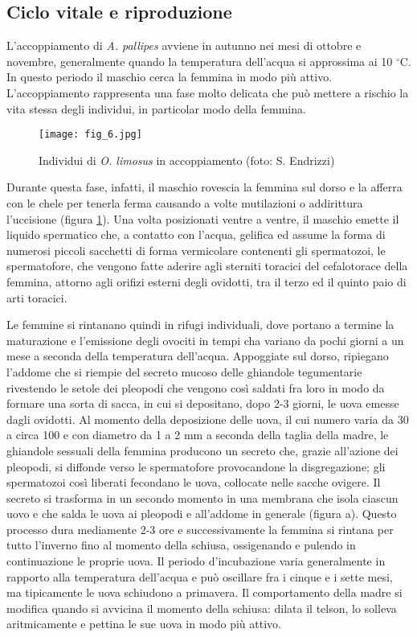 \documentclass[11pt,a4paper,italian,twoside,openany]{memoir}
\begin{document}
\subsection{Ciclo vitale e riproduzione}
L'accoppiamento di \emph{A. pallipes} avviene in autunno nei mesi di ottobre e novembre, generalmente quando la temperatura dell'acqua si approssima ai 10 $^{\circ}$C. In questo periodo il maschio cerca la femmina in modo più attivo. L'accoppiamento rappresenta una fase molto delicata che può mettere a rischio la vita stessa degli individui, in particolar modo della femmina. 

\begin{figure}
  \centering
  \texttt{[image: fig\_6.jpg]}
  \caption{Individui di \emph{O. limosus} in accoppiamento (foto: S. Endrizzi)}
  \label{fig_6}
\end{figure}

Durante questa fase, infatti, il maschio rovescia la femmina sul dorso e la afferra con le chele per tenerla ferma causando a volte mutilazioni o addirittura l'uccisione (figura \ref{fig_6}). Una volta posizionati ventre a ventre, il maschio emette il liquido spermatico che, a contatto con l'acqua, gelifica ed assume la forma di numerosi piccoli sacchetti di forma vermicolare contenenti gli spermatozoi, le spermatofore, che vengono fatte aderire agli sterniti toracici del cefalotorace della femmina, attorno agli orifizi esterni degli ovidotti, tra il terzo ed il quinto paio di arti toracici.

Le femmine si rintanano quindi in rifugi individuali, dove portano a termine la maturazione e l'emissione degli ovociti in tempi cha variano da pochi giorni a un mese a seconda della temperatura dell'acqua. Appoggiate sul dorso, ripiegano l'addome che si riempie del secreto mucoso delle ghiandole tegumentarie rivestendo le setole dei pleopodi che vengono così saldati fra loro in modo da formare una sorta di sacca, in cui si depositano, dopo 2-3 giorni, le uova emesse dagli ovidotti. Al momento della deposizione delle uova, il cui numero varia da 30 a circa 100 e con diametro da 1 a 2 mm a seconda della taglia della madre, le ghiandole sessuali della femmina producono un secreto che, grazie all'azione dei pleopodi, si diffonde verso le spermatofore provocandone la disgregazione; gli spermatozoi così liberati fecondano le uova, collocate nelle sacche ovigere. Il secreto si trasforma in un secondo momento in una membrana che isola ciascun uovo e che salda le uova ai pleopodi e all'addome in generale (figura \label{fig_7}a). Questo processo dura mediamente 2-3 ore e successivamente la femmina si rintana per tutto l'inverno fino al momento della schiusa, ossigenando e pulendo in continuazione le proprie uova. Il periodo d'incubazione varia generalmente in rapporto alla temperatura dell'acqua e può oscillare fra i cinque e i sette mesi, ma tipicamente le uova schiudono a primavera. Il comportamento della madre si modifica quando si avvicina il momento della schiusa: dilata il telson, lo solleva aritmicamente e pettina le sue uova in modo più attivo. 
\end{document}
